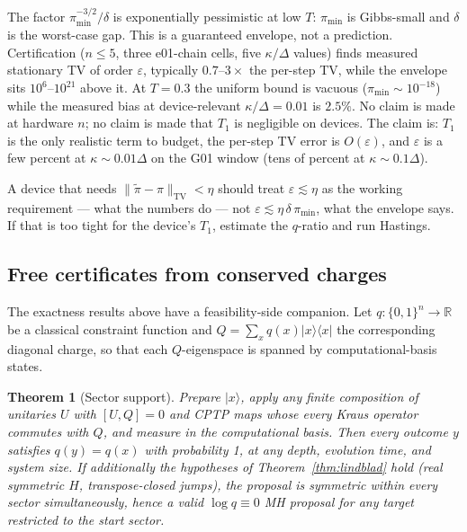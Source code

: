 \documentclass[aps,prx,reprint,floatfix,amsmath,amssymb,amsfonts]{revtex4-2}
\newtheorem{theorem}{Theorem}
\begin{document}
The factor $\pi_{\min}^{-3/2}/\delta$ is exponentially pessimistic at
low $T$: $\pi_{\min}$ is Gibbs-small and $\delta$ is the worst-case gap.
This is a guaranteed envelope, not a prediction. Certification
($n\le 5$, three e01-chain cells, five $\kappa/\Delta$ values) finds
measured stationary TV of order $\varepsilon$, typically $0.7$--$3\times$
the per-step TV, while the envelope sits $10^6$--$10^{21}$ above it. At
$T=0.3$ the uniform bound is vacuous ($\pi_{\min}\sim 10^{-18}$) while
the measured bias at device-relevant $\kappa/\Delta = 0.01$ is $2.5\%$.
No claim is made at hardware $n$; no claim is made that $T_1$ is
negligible on devices. The claim is: $T_1$ is the only realistic term to
budget, the per-step TV error is $O(\varepsilon)$, and $\varepsilon$ is
a few percent at $\kappa \sim 0.01\Delta$ on the G01 window (tens of
percent at $\kappa \sim 0.1\Delta$).

A device that needs $\|\tilde\pi-\pi\|_{\mathrm{TV}} < \eta$ should
treat $\varepsilon \lesssim \eta$ as the working requirement --- what
the numbers do --- not $\varepsilon \lesssim \eta\,\delta\,\pi_{\min}$,
what the envelope says. If that is too tight for the device's $T_1$,
estimate the $q$-ratio and run Hastings.

\subsection{Free certificates from conserved charges}
\label{sec:exactness-sectors}

The exactness results above have a feasibility-side companion. Let
$q:\{0,1\}^n\to\mathbb{R}$ be a classical constraint function and
$Q=\sum_x q(x)|x\rangle\!\langle x|$ the corresponding diagonal charge, so
that each $Q$-eigenspace is spanned by computational-basis states.

\begin{theorem}[Sector support]\label{thm:sector}
Prepare $|x\rangle$, apply any finite composition of unitaries $U$ with
$[U,Q]=0$ and CPTP maps whose every Kraus operator commutes with $Q$,
and measure in the computational basis. Then every outcome $y$
satisfies $q(y)=q(x)$ with probability 1, at any depth, evolution time,
and system size. If additionally the hypotheses of
Theorem~\ref{thm:lindblad} hold (real symmetric $H$, transpose-closed
jumps), the proposal is symmetric \emph{within every sector
simultaneously}, hence a valid $\log q\equiv 0$ MH proposal for any
target restricted to the start sector.
\end{theorem}
\end{document}
